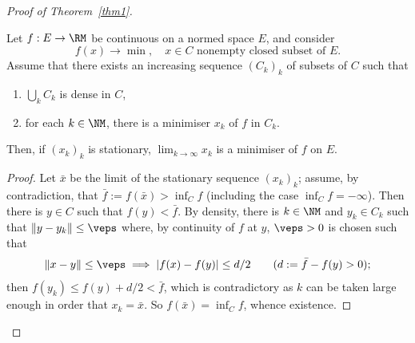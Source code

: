 \begin{proof}[Proof of Theorem~\ref{thm1}]
\begin{lemma} \label{lemma4}
Let $f:E \to \RM$ be continuous on a normed space $E$, and consider
\[
f(x) \to \min,\quad x \in C \text{ nonempty closed subset of }E.
\]
Assume that there exists an increasing sequence $(C_k)_k$
of subsets of $C$ such that
\begin{enumerate}
\item
$\bigcup_k C_k$ is dense in $C$,
\item
for each $k \in \NM$, there is a minimiser $x_k$ of $f$ in $C_k$.
\end{enumerate}
Then, if $(x_k)_k$ is stationary, $\lim_{k \to \infty} x_k$ is a minimiser of $f$ on $E$.
\end{lemma}
\begin{proof} Let $\bar{x}$ be the limit of the stationary sequence $(x_k)_k$; assume,
by contradiction, that $\bar{f}:=f(\bar{x}) > \inf_C f$ (including the case $\inf_C
f=-\infty$). Then there is $y \in C$
such that $f(y)<\bar{f}$. By density, there is $k \in \NM$ and $y_k \in C_k$
such that $\|y-y_k\| \leq \veps$ where, by continuity of $f$ at $y$,
$\veps>0$ is chosen such
that
\[
\|x-y\| \leq \veps \implies |f(x)-f(y)| \leq d/2 \qquad(d:=\bar{f}-f(y)>0);
\]
then $f(y_k) \leq f(y)+d/2 < \bar{f}$, which is contradictory as $k$ can be taken
large enough in order that $x_k=\bar{x}$. So $f(\bar{x})=\inf_C f$, whence existence.
\end{proof}


\end{proof}
